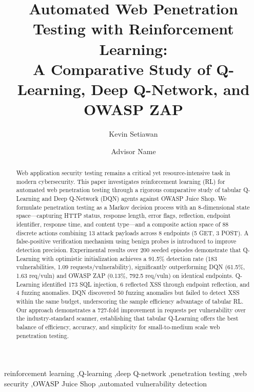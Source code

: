 \documentclass[5p,twocolumn]{elsarticle}
\begin{document}
\begin{frontmatter}

\title{Automated Web Penetration Testing with Reinforcement Learning:\\A Comparative Study of Q-Learning, Deep Q-Network, and OWASP ZAP}

\author[1]{Kevin Setiawan}

\author[1]{Advisor Name}

\address[1]{Department of Informatics, Universitas Contoh, Indonesia}


\begin{abstract}
Web application security testing remains a critical yet resource-intensive task in modern cybersecurity. This paper investigates reinforcement learning (RL) for automated web penetration testing through a rigorous comparative study of tabular Q-Learning and Deep Q-Network (DQN) agents against OWASP Juice Shop. We formulate penetration testing as a Markov decision process with an 8-dimensional state space---capturing HTTP status, response length, error flags, reflection, endpoint identifier, response time, and content type---and a composite action space of 88 discrete actions combining 13 attack payloads across 8 endpoints (5 GET, 3 POST). A false-positive verification mechanism using benign probes is introduced to improve detection precision. Experimental results over 200 seeded episodes demonstrate that Q-Learning with optimistic initialization achieves a 91.5\% detection rate (183 vulnerabilities, 1.09 requests/vulnerability), significantly outperforming DQN (61.5\%, 1.63 req/vuln) and OWASP ZAP (0.13\%, 792.5 req/vuln) on identical endpoints. Q-Learning identified 173 SQL injection, 6 reflected XSS through endpoint reflection, and 4 fuzzing anomalies. DQN discovered 50 fuzzing anomalies but failed to detect XSS within the same budget, underscoring the sample efficiency advantage of tabular RL. Our approach demonstrates a 727-fold improvement in requests per vulnerability over the industry-standard scanner, establishing that tabular Q-Learning offers the best balance of efficiency, accuracy, and simplicity for small-to-medium scale web penetration testing.
\end{abstract}

\begin{keyword}
reinforcement learning \sep Q-learning \sep deep Q-network \sep penetration testing \sep web security \sep OWASP Juice Shop \sep automated vulnerability detection
\end{keyword}

\end{frontmatter}
\end{document}
